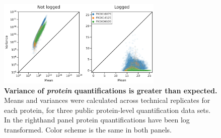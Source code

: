 \documentclass{article}
\begin{document}
\begin{figure}
  \centering
  \includegraphics[width=0.7\textwidth]{figures/protein-distributions-fig-v0.png}
  \caption{{\bf Variance of \textit{protein} quantifications is greater than expected.} Means and variances were calculated across technical replicates for each protein, for three public protein-level quantification data sets. In the righthand panel protein quantifications have been log transformed. Color scheme is the same in both panels.}
  \label{fig:protein-mean-x-var}
\end{figure} 
\end{document}
